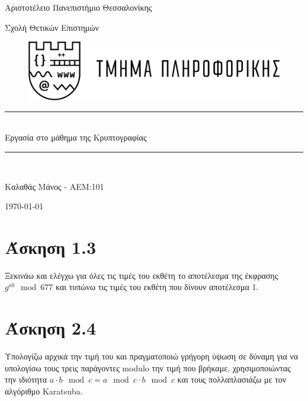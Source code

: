 \documentclass[12pt]{article}
\numberwithin{equation}{section}
\newcommand\blankpage{%
    \null
    \thispagestyle{empty}%
    \addtocounter{page}{-1}%
    \newpage}
\newcommand{\HRule}{\rule{\linewidth}{0.5mm}}
\newcommand{\lt}{\latintext}
\begin{document}
\begin{titlepage}

{\LARGE Αριστοτέλειο Πανεπιστήμιο Θεσσαλονίκης}
\begin{center} {\Large Σχολή Θετικών Επιστημών} \end{center}
\begin{figure}[h]
\raggedright
\hspace{90pt}
\includegraphics[width=0.5\linewidth]{logo.png}
\end{figure}
\begin{center}


\begin{figure}[h]
\centering 
\end{figure}
\begin{center}

\HRule \\[0.4cm]
{\huge Εργασία στο μάθημα της Κρυπτογραφίας}

\HRule \\[0.4cm]
\end{center}

\vfill
\begin{doublespacing}

{\LARGE 
Καλαθάς Μάνος - ΑΕΜ:101 \par}

\vfill 
{\Large \today}
\end{doublespacing}
\end{center}
\end{titlepage}

\tableofcontents

\clearpage

\blankpage

\section{Άσκηση 1.3}
Ξεκινάω και ελέγχω για όλες τις τιμές του εκθέτη το αποτέλεσμα της έκφρασης \(g^{ab} \mod{677}\) και τυπώνω τις τιμές του εκθέτη που δίνουν αποτέλεσμα 1.

\section{Άσκηση 2.4}
Υπολογίζω αρχικά την τιμή του \lt{modulo} και πραγματοποιώ γρήγορη ύψωση σε δύναμη για να υπολογίσω τους τρεις παράγοντες modulo την τιμή που βρήκαμε, χρησιμοποιώντας την ιδιότητα \( a\cdot b \mod{c} = a \mod{c} \cdot b \mod{c} \) και τους πολλαπλασιάζω με τον αλγόριθμο Karatsuba.
\end{document}
